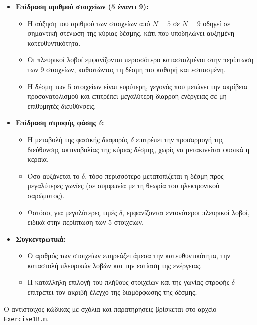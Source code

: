 \documentclass[a4paper,12pt]{report}
\newcommand{\en}{\selectlanguage{english}}
\newcommand{\gr}{\selectlanguage{greek}}
\begin{document}
\begin{itemize}
    \item \textbf{Επίδραση αριθμού στοιχείων (5 έναντι 9):}
    \begin{itemize}
        \item Η αύξηση του αριθμού των στοιχείων από \( N = 5 \) σε \( N = 9 \) οδηγεί σε σημαντική στένωση της κύριας δέσμης, κάτι που υποδηλώνει αυξημένη κατευθυντικότητα.
        \item Οι πλευρικοί λοβοί εμφανίζονται περισσότερο κατασταλμένοι στην περίπτωση των 9 στοιχείων, καθιστώντας τη δέσμη πιο καθαρή και εστιασμένη.
        \item Η δέσμη των 5 στοιχείων είναι ευρύτερη, γεγονός που μειώνει την ακρίβεια προσανατολισμού και επιτρέπει μεγαλύτερη διαρροή ενέργειας σε μη επιθυμητές διευθύνσεις.
    \end{itemize}

    \item \textbf{Επίδραση στροφής φάσης \( \delta \):}
    \begin{itemize}
        \item Η μεταβολή της φασικής διαφοράς \( \delta \) επιτρέπει την προσαρμογή της διεύθυνσης ακτινοβολίας της κύριας δέσμης, χωρίς να μετακινείται φυσικά η κεραία.
        \item Όσο αυξάνεται το \( \delta \), τόσο περισσότερο μετατοπίζεται η δέσμη προς μεγαλύτερες γωνίες (σε συμφωνία με τη θεωρία του ηλεκτρονικού σαρώματος).
        \item Ωστόσο, για μεγαλύτερες τιμές \( \delta \), εμφανίζονται εντονότεροι πλευρικοί λοβοί, ειδικά στην περίπτωση των 5 στοιχείων.
    \end{itemize}

    \item \textbf{Συγκεντρωτικά:}
    \begin{itemize}
        \item Ο αριθμός των στοιχείων επηρεάζει άμεσα την κατευθυντικότητα, την καταστολή πλευρικών λοβών και την εστίαση της ενέργειας.
        \item Η κατάλληλη επιλογή του πλήθους στοιχείων και της γωνίας στροφής \( \delta \) επιτρέπει τον ακριβή έλεγχο της διαμόρφωσης της δέσμης.
    \end{itemize}
\end{itemize}

\vspace{0.2cm}

\hspace{-0.6cm}Ο αντίστοιχος κώδικας με σχόλια και παρατηρήσεις βρίσκεται στο αρχείο \en \texttt{Exercise1B.m}\gr.
\end{document}
